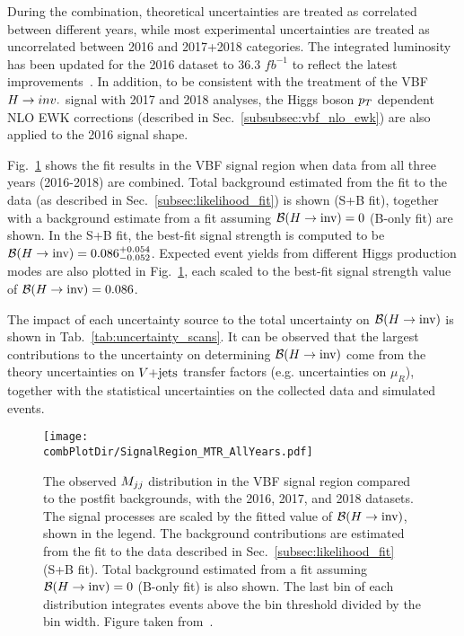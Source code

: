 During the combination, theoretical uncertainties are treated as correlated between different years, while most experimental
uncertainties are treated as uncorrelated between 2016 and 2017+2018 categories.
The integrated luminosity has been updated for the 2016 dataset to 36.3 $fb^{-1}$ to reflect the latest
improvements~\cite{CMS:2021xjt}. In addition, to be consistent with the treatment of the VBF
$H \rightarrow inv.$ signal with 2017 and 2018 analyses, the Higgs boson $p_T$ dependent NLO EWK corrections 
(described in Sec.~\ref{subsubsec:vbf_nlo_ewk}) are also applied to the 2016 signal shape.

Fig.~\ref{fig:mtr_comb_with_2016} shows the fit results in the VBF signal region when data from all three years (2016-2018) 
are combined. Total background estimated from the fit to the data (as described in Sec.~\ref{subsec:likelihood_fit}) is shown (S+B fit),
together with a background estimate from a fit assuming ${\mathcal{B}(H\rightarrow\text{inv})}=0$ (B-only fit) are shown. In the S+B fit, the best-fit signal strength is computed
to be ${\mathcal{B}(H\rightarrow\text{inv})}=0.086^{+0.054}_{-0.052}$. Expected event yields from different Higgs production modes are also plotted in Fig.~\ref{fig:mtr_comb_with_2016}, 
each scaled to the best-fit signal strength value of ${\mathcal{B}(H\rightarrow\text{inv})}=0.086$.

The impact of each uncertainty source to the total uncertainty on ${\mathcal{B}(H\rightarrow\text{inv})}$ is shown in Tab.~\ref{tab:uncertainty_scans}. It can be observed that
the largest contributions to the uncertainty on determining ${\mathcal{B}(H\rightarrow\text{inv})}$ come from the theory uncertainties on $V\text{+jets}$ transfer factors (e.g. uncertainties on $\mu_{R}$),
together with the statistical uncertainties on the collected data and simulated events.

\begin{figure}[htbp]
    \centering
    \texttt{[image: \\combPlotDir/SignalRegion\_MTR\_AllYears.pdf]}
    \caption{The observed $M_{jj}$ distribution in the VBF signal region compared to the postfit backgrounds, with the 
    2016, 2017, and 2018 datasets. The signal processes are scaled by the fitted value of ${\mathcal{B}(H\rightarrow\text{inv})}$, shown in the legend. 
    The background contributions are estimated from 
    the fit to the data described in Sec.~\ref{subsec:likelihood_fit} (S+B fit). 
    Total background estimated from a fit assuming ${\mathcal{B}(H\rightarrow\text{inv})}=0$ (B-only fit) is also shown. 
    The last bin of each distribution integrates events above the bin threshold divided by the bin width. Figure taken from~\cite{VBFHinvAnalysisPaper}.}
    \label{fig:mtr_comb_with_2016}
\end{figure}

